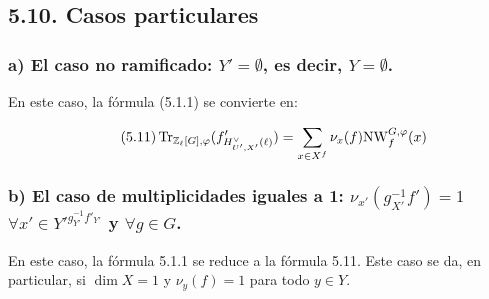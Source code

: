 \subsection*{5.10. Casos particulares}
\subsubsection*{a) El caso no ramificado: $Y' = \emptyset$, es decir, $Y = \emptyset$.}

En este caso, la fórmula (5.1.1) se convierte en:

\begin{equation}\tag{5.11}
\operatorname{Tr}_{\mathbb Z_\ell[G],\varphi}(f'_{H^\vee_{U',X'}(\ell)}) = \sum_{x \in X^f} \nu_x(f) \mathrm{NW}_f^{G,\varphi}(x)
\end{equation}

\subsubsection*{b) El caso de multiplicidades iguales a 1: $\nu_{x'}(g_{X'}^{-1}f') = 1$ $\forall x'\in {Y'}^{g_{Y'}^{-1}f'_{Y'}}$ y $\forall g\in G$.}

En este caso, la fórmula 5.1.1 se reduce a la fórmula 5.11. Este caso se da, en particular, si $\dim X = 1$ y $\nu_y(f)=1$ para todo $y\in Y$.%
